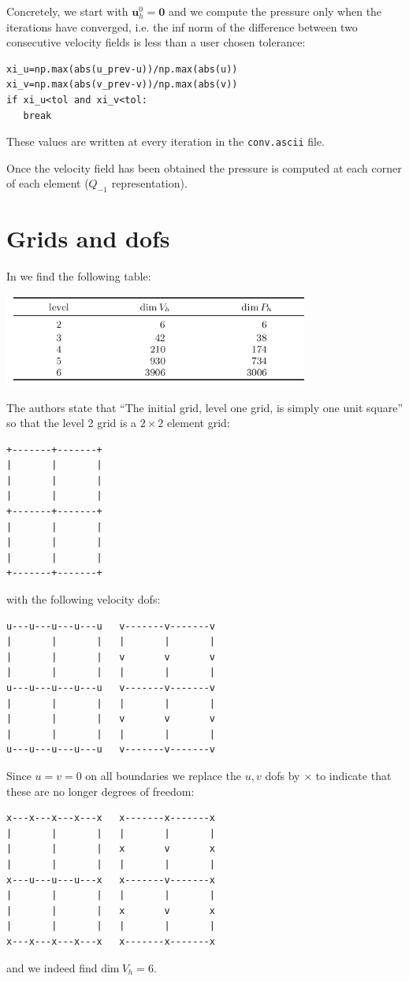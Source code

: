 Concretely, we start with ${\bm u}_h^0={\bm 0}$ and we compute the pressure only when the 
iterations have converged, i.e. the inf norm of the difference between two consecutive 
velocity fields is less than a user chosen tolerance:
\begin{lstlisting}
xi_u=np.max(abs(u_prev-u))/np.max(abs(u))
xi_v=np.max(abs(v_prev-v))/np.max(abs(v))
if xi_u<tol and xi_v<tol:
   break
\end{lstlisting}
These values are written at every iteration in the {\tt conv.ascii} file.

Once the velocity field has been obtained the pressure is computed 
at each corner of each element ($Q_{-1}$ representation).

\newpage
\section*{Grids and dofs}

In \textcite{huzh11} we find the following table:

\begin{center}
\includegraphics[width=10cm]{python_codes/fieldstone_161/images/dofs}
\end{center}

The authors state that ``The initial grid, level one grid, is simply one unit square''
so that the level 2 grid is a $2\times 2$ element grid:
\begin{verbatim}
+-------+-------+
|       |       |
|       |       |
|       |       |
+-------+-------+
|       |       |
|       |       |
|       |       |
+-------+-------+
\end{verbatim}
with the following velocity dofs:
\begin{verbatim}
u---u---u---u---u   v-------v-------v
|       |       |   |       |       |
|       |       |   v       v       v
|       |       |   |       |       |
u---u---u---u---u   v-------v-------v
|       |       |   |       |       |
|       |       |   v       v       v
|       |       |   |       |       |
u---u---u---u---u   v-------v-------v
\end{verbatim}
Since $u=v=0$ on all boundaries we replace the $u,v$ dofs by $\times$
to indicate that these are no longer degrees of freedom:
\begin{verbatim}
x---x---x---x---x   x-------x-------x
|       |       |   |       |       |
|       |       |   x       v       x
|       |       |   |       |       |
x---u---u---u---x   x-------v-------x
|       |       |   |       |       |
|       |       |   x       v       x
|       |       |   |       |       |
x---x---x---x---x   x-------x-------x
\end{verbatim}
and we indeed find $\text{dim}~V_h=6$. 

